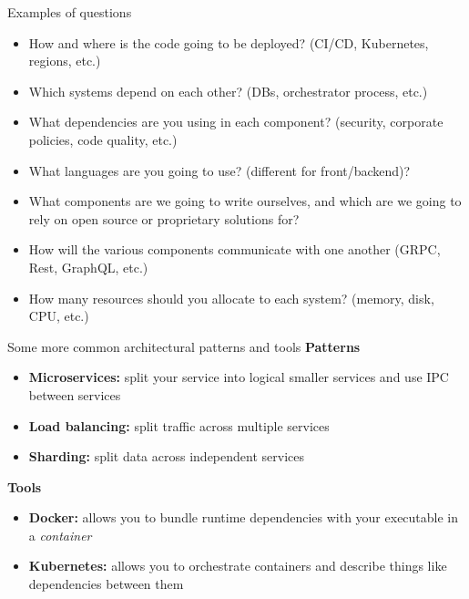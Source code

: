 \documentclass{beeper}
\begin{document}
\begin{frame}{Examples of questions}
    \begin{itemize}[<+->]
        \item How and where is the code going to be deployed? (CI/CD,
            Kubernetes, regions, etc.)
        \item Which systems depend on each other? (DBs, orchestrator process,
            etc.)
        \item What dependencies are you using in each component? (security,
            corporate policies, code quality, etc.)
        \item What languages are you going to use? (different for
            front/backend)?
        \item What components are we going to write ourselves, and which are we
            going to rely on open source or proprietary solutions for?
        \item How will the various components communicate with one another
            (GRPC, Rest, GraphQL, etc.)
        \item How many resources should you allocate to each system? (memory,
            disk, CPU, etc.)
    \end{itemize}
\end{frame}

\begin{frame}{Some more common architectural patterns and tools}
    \textbf{Patterns}
    \begin{itemize}[<+->]
        \item \textbf{Microservices:} split your service into logical smaller
            services and use IPC between services
        \item \textbf{Load balancing:} split traffic across multiple services
        \item \textbf{Sharding:} split data across independent services
    \end{itemize}
    \pause[\thebeamerpauses]

    \textbf{Tools}
    \begin{itemize}[<+->]
        \item \textbf{Docker:} allows you to bundle runtime dependencies with
            your executable in a \textit{container}
        \item \textbf{Kubernetes:} allows you to orchestrate containers and
            describe things like dependencies between them
    \end{itemize}
\end{frame}
\end{document}

